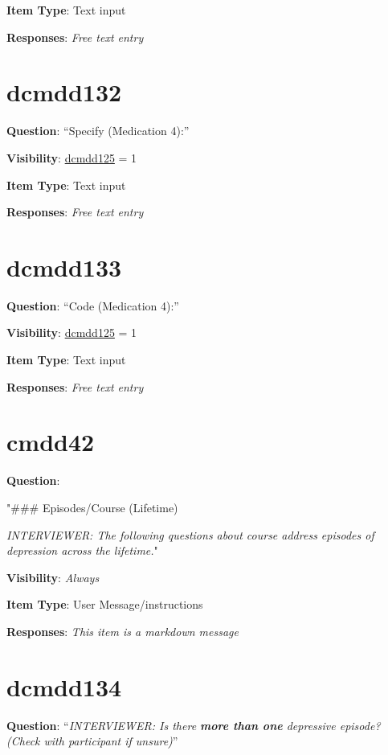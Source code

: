 \documentclass[
]{book}
\begin{document}
\textbf{Item Type}: Text input

\textbf{Responses}: \emph{Free text entry}

\hypertarget{dcmdd132}{%
\section{dcmdd132}\label{dcmdd132}}

\textbf{Question}: ``Specify (Medication 4):''

\textbf{Visibility}: \protect\hyperlink{dcmdd125}{dcmdd125} = 1

\textbf{Item Type}: Text input

\textbf{Responses}: \emph{Free text entry}

\hypertarget{dcmdd133}{%
\section{dcmdd133}\label{dcmdd133}}

\textbf{Question}: ``Code (Medication 4):''

\textbf{Visibility}: \protect\hyperlink{dcmdd125}{dcmdd125} = 1

\textbf{Item Type}: Text input

\textbf{Responses}: \emph{Free text entry}

\hypertarget{cmdd42}{%
\section{cmdd42}\label{cmdd42}}

\textbf{Question}:

"\#\#\# Episodes/Course (Lifetime)

\emph{INTERVIEWER: The following questions about course address episodes of depression across the lifetime.}"

\textbf{Visibility}: \emph{Always}

\textbf{Item Type}: User Message/instructions

\textbf{Responses}: \emph{This item is a markdown message}

\hypertarget{dcmdd134}{%
\section{dcmdd134}\label{dcmdd134}}

\textbf{Question}: ``\emph{INTERVIEWER: Is there \textbf{more than one} depressive episode? (Check with participant if unsure)}''
\end{document}
